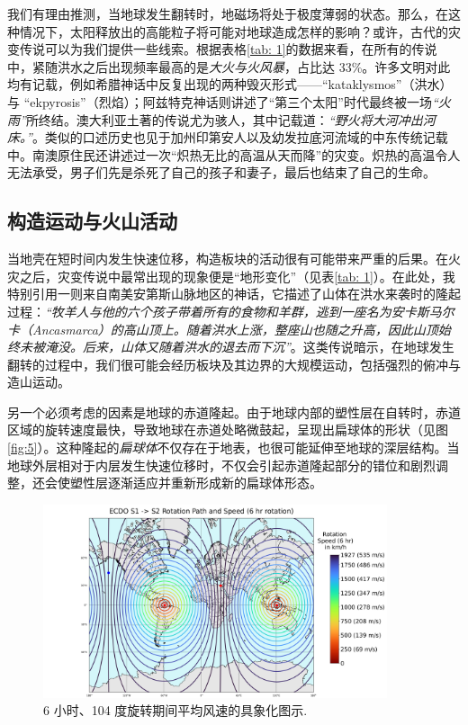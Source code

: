 \documentclass[10pt,twocolumn,letterpaper]{article}
\begin{document}
我们有理由推测，当地球发生翻转时，地磁场将处于极度薄弱的状态。那么，在这种情况下，太阳释放出的高能粒子将可能对地球造成怎样的影响？或许，古代的灾变传说可以为我们提供一些线索。根据表格\ref{tab: 1}的数据来看，在所有的传说中，紧随洪水之后出现频率最高的是\textit{大火与火风暴}，占比达 33\%。许多文明对此均有记载，例如希腊神话中反复出现的两种毁灭形式——“kataklysmos”（洪水）与 “ekpyrosis”（烈焰）\cite{13}；阿兹特克神话则讲述了“第三个太阳”时代最终被一场\textit{“火雨”}所终结\cite{14}。澳大利亚土著的传说尤为骇人，其中记载道：\textit{“野火将大河冲出河床。”}。类似的口述历史也见于加州印第安人以及幼发拉底河流域的中东传统记载中。南澳原住民还讲述过一次“炽热无比的高温从天而降”的灾变。炽热的高温令人无法承受，男子们先是杀死了自己的孩子和妻子，最后也结束了自己的生命。\cite{15}

\subsection{构造运动与火山活动}
当地壳在短时间内发生快速位移，构造板块的活动很有可能带来严重的后果。在火灾之后，灾变传说中最常出现的现象便是“地形变化”（见表\ref{tab: 1}）。在此处，我特别引用一则来自南美安第斯山脉地区的神话，它描述了山体在洪水来袭时的隆起过程：\textit{“牧羊人与他的六个孩子带着所有的食物和羊群，逃到一座名为安卡斯马尔卡（Ancasmarca）的高山顶上。随着洪水上涨，整座山也随之升高，因此山顶始终未被淹没。后来，山体又随着洪水的退去而下沉”}\cite{17}。这类传说暗示，在地球发生翻转的过程中，我们很可能会经历板块及其边界的大规模运动，包括强烈的俯冲与造山运动。

另一个必须考虑的因素是地球的赤道隆起。由于地球内部的塑性层在自转时，赤道区域的旋转速度最快，导致地球在赤道处略微鼓起，呈现出扁球体的形状（见图\ref{fig:5}）。这种隆起的\textit{扁球体}不仅存在于地表，也很可能延伸至地球的深层结构。当地球外层相对于内层发生快速位移时，不仅会引起赤道隆起部分的错位和剧烈调整，还会使塑性层逐渐适应并重新形成新的扁球体形态。
\begin{figure}[t]
\begin{center}
\includegraphics[width=0.9\textwidth]{rotate2.png}
\end{center}
   \caption{6 小时、104 度旋转期间平均风速的具象化图示\cite{2}.}
   \label{fig:6}
\end{figure}
\end{document}
